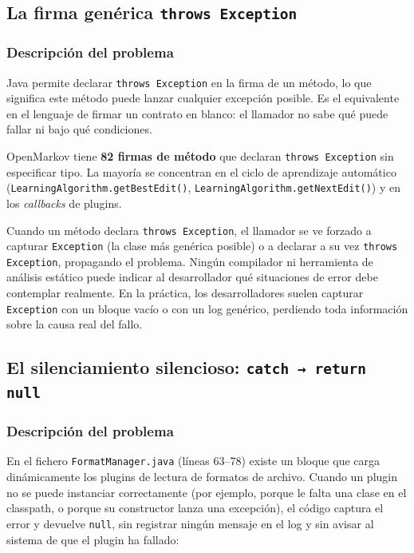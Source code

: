 \documentclass[11pt,a4paper]{article}
\newcommand{\jdot}{.\discretionary{}{}{}}
\begin{document}
\subsection{La firma genérica \texttt{throws Exception}}

\subsubsection{Descripción del problema}

Java permite declarar \texttt{throws Exception} en la firma de un método, lo que significa
\guillemotleft este método puede lanzar cualquier excepción posible\guillemotright . Es el equivalente en el lenguaje de
firmar un contrato en blanco: el llamador no sabe qué puede fallar ni bajo qué condiciones.

OpenMarkov tiene \textbf{82 firmas de método} que declaran \texttt{throws Exception} sin
especificar tipo. La mayoría se concentran en el ciclo de aprendizaje automático
(\texttt{LearningAlgorithm\jdot getBestEdit()}, \texttt{LearningAlgorithm\jdot getNextEdit()}) y en
los \textit{callbacks} de plugins.

\begin{consecuenciabox}
    Cuando un método declara \texttt{throws Exception}, el llamador se ve forzado a capturar
    \texttt{Exception} (la clase más genérica posible) o a declarar a su vez \texttt{throws
    Exception}, propagando el problema. Ningún compilador ni herramienta de análisis estático
    puede indicar al desarrollador qué situaciones de error debe contemplar realmente. En la
    práctica, los desarrolladores suelen capturar \texttt{Exception} con un bloque vacío o con
    un log genérico, perdiendo toda información sobre la causa real del fallo.
\end{consecuenciabox}

\subsection{El silenciamiento silencioso: \texttt{catch → return null}}

\subsubsection{Descripción del problema}

En el fichero \texttt{FormatManager.java} (líneas 63--78) existe un bloque que carga dinámicamente
los plugins de lectura de formatos de archivo. Cuando un plugin no se puede instanciar correctamente
(por ejemplo, porque le falta una clase en el classpath, o porque su constructor lanza una excepción),
el código captura el error y devuelve \texttt{null}, sin registrar ningún mensaje en el log y sin
avisar al sistema de que el plugin ha fallado:
\end{document}
